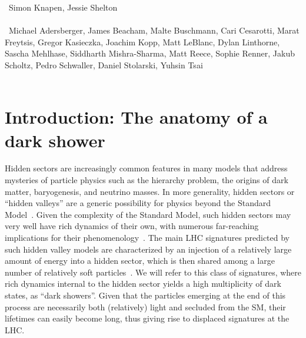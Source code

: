 ~Simon Knapen, Jessie Shelton \\
\text{ \; }\\
~Michael Adersberger, James Beacham, Malte Buschmann, Cari Cesarotti, Marat Freytsis, Gregor Kasieczka, Joachim Kopp, Matt LeBlanc, Dylan Linthorne,  Sascha Mehlhase, Siddharth Mishra-Sharma, Matt Reece, Sophie Renner, Jakub Scholtz, Pedro Schwaller, Daniel Stolarski, Yuhsin Tsai \\
\text{ \; }\\

\section{Introduction: The anatomy of a dark shower}
\label{sec:darkshowerintro}

Hidden sectors are increasingly common features in many models that address mysteries of particle physics such as the hierarchy problem, the origins of dark matter, baryogenesis, and neutrino masses. In more generality, hidden sectors or ``hidden valleys'' are a generic possibility for physics beyond the Standard Model~\cite{Strassler:2006im,Han:2007ae}. Given the complexity of the Standard Model, such hidden sectors may very well have rich dynamics of their own, with numerous far-reaching implications for their phenomenology~\cite{Strassler:2006ri,Strassler:2006qa,Strassler:2008bv,Strassler:2008fv,Juknevich:2009ji}. The main LHC signatures predicted by such hidden valley models are characterized by an injection of a relatively large amount of energy into a hidden sector, which is then shared among a large number of relatively soft particles~\cite{Strassler:2008bv}. We will refer to this class of signatures, where rich dynamics internal to the hidden sector yields a high multiplicity of dark states, as ``dark showers''. Given that the particles emerging at the end of this process are necessarily both (relatively) light and secluded from the SM, their lifetimes can easily become long, thus giving rise to displaced signatures at the LHC.

